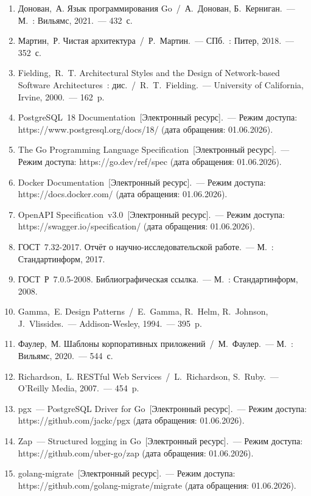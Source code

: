 \documentclass[a4paper,14pt]{extarticle}
\begin{document}
\begin{enumerate}[leftmargin=1.25cm, itemsep=2pt, label=\arabic*.]
  \item Донован,~А. Язык программирования Go~/~А.~Донован, Б.~Керниган.~--- М.~: Вильямс, 2021.~--- 432~с.
  \item Мартин,~Р. Чистая архитектура~/~Р.~Мартин.~--- СПб.~: Питер, 2018.~--- 352~с.
  \item Fielding,~R.~T. Architectural Styles and the Design of Network-based Software Architectures~: дис.~/~R.~T.~Fielding.~--- University of California, Irvine, 2000.~--- 162~p.
  \item PostgreSQL~18 Documentation~[Электронный ресурс].~--- Режим доступа: https://www.postgresql.org/docs/18/ (дата обращения: 01.06.2026).
  \item The Go Programming Language Specification~[Электронный ресурс].~--- Режим доступа: https://go.dev/ref/spec (дата обращения: 01.06.2026).
  \item Docker Documentation~[Электронный ресурс].~--- Режим доступа: https://docs.docker.com/ (дата обращения: 01.06.2026).
  \item OpenAPI Specification~v3.0~[Электронный ресурс].~--- Режим доступа: https://swagger.io/specification/ (дата обращения: 01.06.2026).
  \item ГОСТ~7.32-2017. Отчёт о научно-исследовательской работе.~--- М.~: Стандартинформ, 2017.
  \item ГОСТ~Р~7.0.5-2008. Библиографическая ссылка.~--- М.~: Стандартинформ, 2008.
  \item Gamma,~E. Design Patterns~/~E.~Gamma, R.~Helm, R.~Johnson, J.~Vlissides.~--- Addison-Wesley, 1994.~--- 395~p.
  \item Фаулер,~М. Шаблоны корпоративных приложений~/~М.~Фаулер.~--- М.~: Вильямс, 2020.~--- 544~с.
  \item Richardson,~L. RESTful Web Services~/~L.~Richardson, S.~Ruby.~--- O'Reilly Media, 2007.~--- 454~p.
  \item pgx~--- PostgreSQL Driver for Go~[Электронный ресурс].~--- Режим доступа: https://github.com/jackc/pgx (дата обращения: 01.06.2026).
  \item Zap~--- Structured logging in Go~[Электронный ресурс].~--- Режим доступа: https://github.com/uber-go/zap (дата обращения: 01.06.2026).
  \item golang-migrate~[Электронный ресурс].~--- Режим доступа: https://github.com/golang-migrate/migrate (дата обращения: 01.06.2026).
\end{enumerate}
\end{document}
